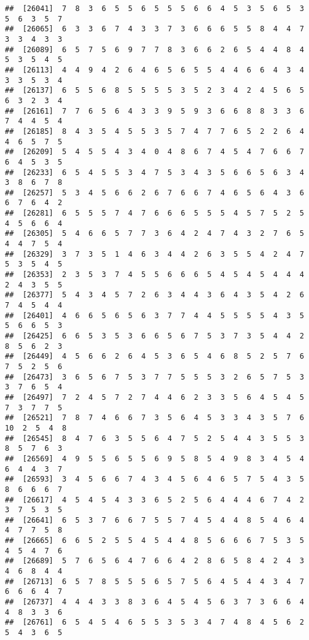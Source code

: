 \documentclass[
]{book}
\begin{document}
\begin{verbatim}
##  [26041]  7  8  3  6  5  5  6  5  5  5  6  6  4  5  3  5  6  5  3  5  6  3  5  7
##  [26065]  6  3  3  6  7  4  3  3  7  3  6  6  6  5  5  8  4  4  7  3  3  4  3  3
##  [26089]  6  5  7  5  6  9  7  7  8  3  6  6  2  6  5  4  4  8  4  5  3  5  4  5
##  [26113]  4  4  9  4  2  6  4  6  5  6  5  5  4  4  6  6  4  3  4  3  3  5  3  4
##  [26137]  6  5  5  6  8  5  5  5  5  3  5  2  3  4  2  4  5  6  5  6  3  2  3  4
##  [26161]  7  7  6  5  6  4  3  3  9  5  9  3  6  6  8  8  3  3  6  7  4  4  5  4
##  [26185]  8  4  3  5  4  5  5  3  5  7  4  7  7  6  5  2  2  6  4  4  6  5  7  5
##  [26209]  5  4  5  5  4  3  4  0  4  8  6  7  4  5  4  7  6  6  7  6  4  5  3  5
##  [26233]  6  5  4  5  5  3  4  7  5  3  4  3  5  6  6  5  6  3  4  3  8  6  7  8
##  [26257]  5  3  4  5  6  6  2  6  7  6  6  7  4  6  5  6  4  3  6  6  7  6  4  2
##  [26281]  6  5  5  5  7  4  7  6  6  6  5  5  5  4  5  7  5  2  5  4  5  6  6  4
##  [26305]  5  4  6  6  5  7  7  3  6  4  2  4  7  4  3  2  7  6  5  4  4  7  5  4
##  [26329]  3  7  3  5  1  4  6  3  4  4  2  6  3  5  5  4  2  4  7  5  3  5  4  5
##  [26353]  2  3  5  3  7  4  5  5  6  6  6  5  4  5  4  5  4  4  4  2  4  3  5  5
##  [26377]  5  4  3  4  5  7  2  6  3  4  4  3  6  4  3  5  4  2  6  7  4  5  4  4
##  [26401]  4  6  6  5  6  5  6  3  7  7  4  4  5  5  5  5  4  3  5  5  6  6  5  3
##  [26425]  6  6  5  3  5  3  6  6  5  6  7  5  3  7  3  5  4  4  2  8  5  6  2  3
##  [26449]  4  5  6  6  2  6  4  5  3  6  5  4  6  8  5  2  5  7  6  7  5  2  5  6
##  [26473]  3  6  5  6  7  5  3  7  7  5  5  5  3  2  6  5  7  5  3  3  7  6  5  4
##  [26497]  7  2  4  5  7  2  7  4  4  6  2  3  3  5  6  4  5  4  5  7  3  7  7  5
##  [26521]  7  8  7  4  6  6  7  3  5  6  4  5  3  3  4  3  5  7  6 10  2  5  4  8
##  [26545]  8  4  7  6  3  5  5  6  4  7  5  2  5  4  4  3  5  5  3  8  5  7  6  3
##  [26569]  4  9  5  5  6  5  5  6  9  5  8  5  4  9  8  3  4  5  4  6  4  4  3  7
##  [26593]  3  4  5  6  6  7  4  3  4  5  6  4  6  5  7  5  4  3  5  8  6  6  6  7
##  [26617]  4  5  4  5  4  3  3  6  5  2  5  6  4  4  4  6  7  4  2  3  7  5  3  5
##  [26641]  6  5  3  7  6  6  7  5  5  7  4  5  4  4  8  5  4  6  4  4  7  7  5  8
##  [26665]  6  6  5  2  5  5  4  5  4  4  8  5  6  6  6  7  5  3  5  4  5  4  7  6
##  [26689]  5  7  6  5  6  4  7  6  6  4  2  8  6  5  8  4  2  4  3  4  6  8  4  4
##  [26713]  6  5  7  8  5  5  5  6  5  7  5  6  4  5  4  4  3  4  7  6  6  6  4  7
##  [26737]  4  4  4  3  3  8  3  6  4  5  4  5  6  3  7  3  6  6  4  4  8  3  3  6
##  [26761]  6  5  4  5  4  6  5  5  3  5  3  4  7  4  8  4  5  6  2  5  4  3  6  5

\end{verbatim}
\end{document}
